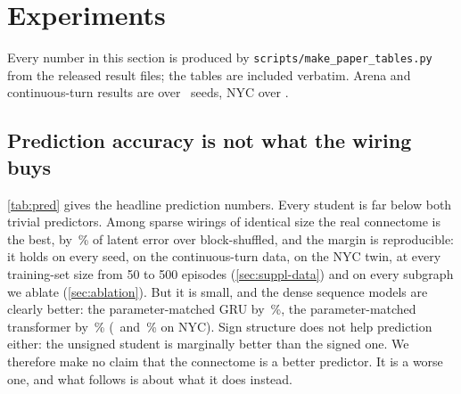 \section{Experiments}
\label{sec:experiments}

Every number in this section is produced by \texttt{scripts/make\_paper\_tables.py} from the released result files;
the tables are included verbatim. Arena and continuous-turn results are over \nSeeds\ seeds, NYC over \nSeedsNyc.

\subsection{Prediction accuracy is not what the wiring buys}
\label{sec:prediction}

\begin{table}[t]
  \centering\small
  \setlength{\tabcolsep}{4pt}
  
  \caption{\textbf{Blind-horizon latent prediction.} Mean MSE over blind horizons 1 to 8 in whitened PCA-256 space
  (mean\pm sd over seeds) and cosine to the teacher latent, on the arena, on the arena with continuous turn angles and
  on the NYC twin. Every student beats both trivial predictors. The parameter-matched GRU and transformer beat every
  sparse student; among sparse wirings of identical size the real connectome is the best by about one percent. The
  attention-input rows replace the shared linear input map by a per-neuron cross-attention encoder (\cref{sec:student});
  the hybrid row adds one attention layer over cell-type tokens to the connectome recurrence.}
  \label{tab:pred}
\end{table}

\cref{tab:pred} gives the headline prediction numbers. Every student is far below both trivial predictors. Among sparse
wirings of identical size the real connectome is the best, by \nConnOverBlockArena\,\% of latent error over
block-shuffled, and the margin is reproducible: it holds on every seed, on the continuous-turn data, on the NYC twin, at
every training-set size from 50 to 500 episodes (\cref{sec:suppl-data}) and on every subgraph we ablate
(\cref{sec:ablation}). But it is small, and the dense sequence models are clearly better: the parameter-matched GRU by
\nGruBetterArena\,\%, the parameter-matched transformer by \nTfBetterArena\,\% (\nGruBetterNyc\ and \nTfBetterNyc\,\% on
NYC). Sign structure does not help prediction either: the unsigned student is marginally better than the signed one.
We therefore make no claim that the connectome is a better predictor. It is a worse one, and what follows is about what
it does instead.


